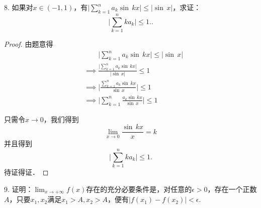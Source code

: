 8. 如果对$x \in (-1,1)$，有$\bigg\lvert \displaystyle\sum_{k=1}^n a_k \sin \, kx \bigg\rvert \leq \lvert \sin \, x \rvert$，求证：
\begin{equation}
    \bigg\lvert \sum_{k=1}^n k a_k \bigg\rvert \leq 1..
\end{equation}

\begin{proof}
    由题意得
    \begin{align}
        &\mathrel{\phantom{\implies}} \bigg\lvert \sum_{k=1}^n a_k \sin \, kx \bigg\rvert \leq \lvert \sin \, x \rvert \\
        &\implies \displaystyle\frac{\bigg\lvert\displaystyle\sum_{k=1}^n a_k \sin \, kx \bigg\rvert}{\lvert \sin \, x \rvert} \leq 1 \\
        &\implies \Bigg\lvert \displaystyle\frac{\displaystyle\sum_{k=1}^n a_k \sin \, kx}{\sin \, x} \Bigg\rvert \leq 1 \\
        &\implies \Bigg\lvert \sum_{k=1}^n \displaystyle\frac{a_k \sin \, kx}{\sin \, x} \Bigg\rvert \leq 1
    \end{align}

    只需令$x \to 0$，我们得到
    \begin{equation}
        \lim_{x \to 0} \frac{\sin \, kx}{x} = k
    \end{equation}
    并且得到
    \begin{equation}
        \Bigg\lvert \sum_{k=1}^n k a_k \Bigg\rvert \leq 1.
    \end{equation}
    待证得证．
\end{proof}

9. 证明：$\displaystyle\lim_{x \to +\infty} f(x)$存在的充分必要条件是，对任意的$\epsilon > 0$，存在一个正数$A$，只要$x_1, x_2$满足$x_1 > A, x_2 > A$，便有$\lvert f(x_1) - f(x_2) \rvert < \epsilon$.

